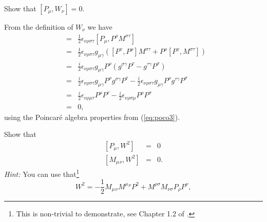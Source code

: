 \documentclass[notes.tex]{subfiles}
\begin{document}
\begin{Exercise}[]
Show that $[P_\mu,W_\nu]=0$.
\end{Exercise}

\begin{Answer} 
From the definition of $W_\nu$ we have
\begin{eqnarray*}
[P_\mu,W_\nu] &=& \frac{1}{2}\epsilon_{\nu\rho\sigma\tau}[P_\mu,P^\rho M^{\sigma\tau}] \\
&=& \frac{1}{2}\epsilon_{\nu\rho\sigma\tau}g_{\mu\gamma}([P^\gamma,P^\rho]M^{\sigma\tau} + P^\rho[P^\gamma, M^{\sigma\tau}] )\\
&=& \frac{i}{2}\epsilon_{\nu\rho\sigma\tau}g_{\mu\gamma}P^\rho(g^{\sigma\gamma} P^\tau-g^{\tau\gamma}P^\sigma)\\
&=& \frac{i}{2}\epsilon_{\nu\rho\sigma\tau}g_{\mu\gamma}P^\rho g^{\sigma\gamma} P^\tau-\frac{i}{2}\epsilon_{\nu\rho\sigma\tau}g_{\mu\gamma}P^\rho g^{\tau\gamma}P^\sigma\\
&=& \frac{i}{2}\epsilon_{\nu\rho\mu\tau}P^\rho  P^\tau-\frac{i}{2}\epsilon_{\nu\rho\sigma\mu}P^\rho P^\sigma\\
&=& 0,
\end{eqnarray*}
using the Poincaré algebra properties from (\ref{eq:poco3}).
\end{Answer}


\begin{Exercise}[]
Show that
\begin{eqnarray}
\left[P_\mu, W^2\right] &=& 0 \\
\left[M_\mu{}_\nu, W^2\right] &=& 0.
\end{eqnarray}
{\it Hint:} You can use that\footnote{This is non-trivial to demonstrate, see Chapter 1.2 of \cite{IntrSUSY2010}.}
 \[W^2 = -\frac{1}{2} M_\mu{}_\nu M^{\mu}{}^{\nu}P^2 + M^{\rho\sigma}M_{\nu\sigma}P_\rho P^\nu, \]
\end{Exercise}
\end{document}
